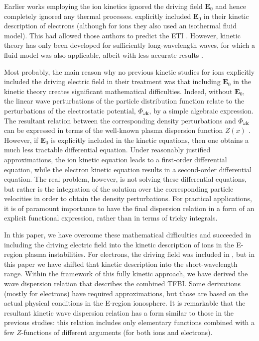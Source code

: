 \documentclass[draft]{agujournal2019}
\renewcommand{\vec}{\mathbf}
\begin{document}
Earlier works employing the ion kinetics ignored the driving field $\vec{E}_{0}$ and 
hence completely ignored any thermal processes. 
explicitly included $\vec{E}_{0}$ in their kinetic description of electrons
(although for ions they also used an isothermal fluid model). This had allowed those authors to predict the ETI
\cite{Dimant:Kinetic95c,Dimant:Physical97}. However,  kinetic theory has
only been developed for sufficiently long-wavelength waves, for which a fluid
model was also applicable, albeit with less accurate results
\cite{Dimant:Physical97,Robinson:Effects:98,St.-Maurice:Role00,Dimant:Unified23}.

Most probably, the main reason why no previous kinetic studies for ions explicitly included
the driving electric field in their treatment was that including $\vec{E}_{0}$
in the kinetic theory creates significant mathematical difficulties. Indeed, without
$\vec{E}_{0}$, the linear wave perturbations of the particle distribution
function %
relate to the perturbations of the
electrostatic potential, $\Phi_{\omega\vec{k}}$, by a simple algebraic expression.
The resultant relation between the corresponding density perturbations
and $\Phi_{\omega\vec{k}}$ can be expressed in terms of the well-known
plasma dispersion function $Z(x)$ \cite{Fried:Plasma61}. However, if $\vec
{E}_{0}$ is explicitly included in the kinetic equations, then one obtains a much less tractable differential
equation. Under reasonably justified approximations, the ion kinetic equation
leads to a first-order differential equation, while the electron kinetic
equation results in a second-order differential equation. The real
problem, however, is not solving these differential
equations, but rather is the integration of the solution over the
corresponding particle velocities in order to obtain the density
perturbations. For practical applications, it is of paramount importance to
have the final dispersion relation in a form of an explicit functional
expression, rather than in terms of tricky integrals.

In this paper, we have overcome these mathematical difficulties and 
succeeded in including the driving electric field into the kinetic
description of ions in the E-region plasma instabilities. For electrons, the driving 
field was included in ,
but in this paper we have shifted that kinetic description into the short-wavelength range. Within the
framework of this fully kinetic approach, we have derived the wave dispersion
relation that describes the combined TFBI. Some derivations (mostly for electrons) have required
approximations, but those are based on the actual physical
conditions in the E-region ionosphere. It is remarkable that the resultant kinetic wave
dispersion relation has a form similar to those in the previous studies: 
this relation includes only elementary functions combined with a few
$Z$-functions of different arguments (for both ions and electrons). 
\end{document}

